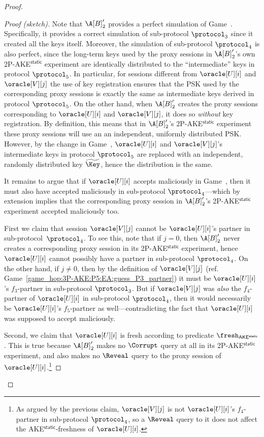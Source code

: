 \begin{proof}
\begin{proof}[Proof (sketch)]
Note that $\A[B]'_2$ provides a perfect simulation of Game~\game{}.
Specifically,
it provides a correct simulation of sub-protocol $\protocol_3$ since it created all the keys itself.
Moreover,
the simulation of sub-protocol $\protocol_4$ is also perfect,
since the long-term keys used by the proxy sessions in $\A[B]'_2$'s own 2P-AKE$^\mathsf{static}$ experiment are identically distributed to the ``intermediate'' keys in  protocol $\protocol_5$.
In particular,
for sessions different from $\oracle[U][i]$ and $\oracle[V][j]$ the use of key registration ensures that the PSK used by the corresponding proxy sessions is exactly the same as intermediate keys derived in protocol $\protocol_5$. 
On the other hand,
when $\A[B]'_2$ creates the proxy sessions corresponding to $\oracle[U][i]$ and $\oracle[V][j]$,
it does so \emph{without} key registration.
By definition,
this means that in $\A[B]'_2$'s 2P-AKE$^\mathsf{static}$ experiment these proxy sessions  will use an 
an independent, uniformly distributed PSK.
However,
by the change in Game~\game{},
$\oracle[U][i]$ and $\oracle[V][j]$'s intermediate keys in protocol $\protocol_5$ are replaced with an independent, randomly distributed key $\widetilde{\Key}$,
hence the distribution is the same.


\medskip
It remains to argue that if $\oracle[U][i]$ accepts maliciously in Game~\game{},
then it must also have accepted maliciously in sub-protocol $\protocol_4$---which by extension implies that the corresponding proxy session in $\A[B]'_2$'s 2P-AKE$^\mathsf{static}$ experiment accepted maliciously too.

First we claim that session $\oracle[V][j]$ cannot be $\oracle[U][i]$'s partner in sub-protocol~$\protocol_4$.
To see this,
note that if $j = 0$,
then $\A[B]'_2$ never creates a corresponding proxy session in its 2P-AKE$^\mathsf{static}$ experiment,
hence $\oracle[U][i]$ cannot possibly have a partner in sub-protocol $\protocol_4$.
On the other hand,
if $j \neq 0$,
then by the definition of $\oracle[V][j]$  (ref. Game~\ref{game_hop:3P-AKE:P5:EA:guess_P3_partner}) 
it must be $\oracle[U][i]$'s $f_3$-partner in sub-protocol $\protocol_3$.
But if $\oracle[V][j]$ was \emph{also} the $f_4$-partner of $\oracle[U][i]$ in sub-protocol $\protocol_4$,
then it would necessarily be $\oracle[U][i]$'s $f_5$-partner as well---contradicting the fact that $\oracle[U][i]$ was supposed to accept maliciously.

Second,
we claim that $\oracle[U][i]$ is fresh according to predicate $\fresh_{\mathsf{AKE^{static}}}$.
This is true because $\A[B]'_2$ makes no $\Corrupt$ query at all in its 2P-AKE$^\mathsf{static}$ experiment,
and also makes  no $\Reveal$ query to the proxy session of $\oracle[U][i]$.\footnote{As argued by the previous claim,
$\oracle[V][j]$ is not $\oracle[U][i]$'s $f_4$-partner in sub-protocol $\protocol_4$,
so a $\Reveal$ query to it does not affect the AKE$^{\mathsf{static}}$-freshness of $\oracle[U][i]$.
}


\end{proof}
\end{proof}

